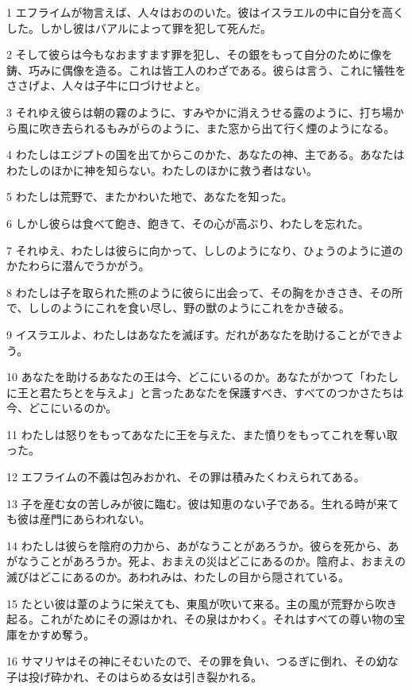 \par 1 エフライムが物言えば、人々はおののいた。彼はイスラエルの中に自分を高くした。しかし彼はバアルによって罪を犯して死んだ。
\par 2 そして彼らは今もなおますます罪を犯し、その銀をもって自分のために像を鋳、巧みに偶像を造る。これは皆工人のわざである。彼らは言う、これに犠牲をささげよ、人々は子牛に口づけせよと。
\par 3 それゆえ彼らは朝の霧のように、すみやかに消えうせる露のように、打ち場から風に吹き去られるもみがらのように、また窓から出て行く煙のようになる。
\par 4 わたしはエジプトの国を出てからこのかた、あなたの神、主である。あなたはわたしのほかに神を知らない。わたしのほかに救う者はない。
\par 5 わたしは荒野で、またかわいた地で、あなたを知った。
\par 6 しかし彼らは食べて飽き、飽きて、その心が高ぶり、わたしを忘れた。
\par 7 それゆえ、わたしは彼らに向かって、ししのようになり、ひょうのように道のかたわらに潜んでうかがう。
\par 8 わたしは子を取られた熊のように彼らに出会って、その胸をかきさき、その所で、ししのようにこれを食い尽し、野の獣のようにこれをかき破る。
\par 9 イスラエルよ、わたしはあなたを滅ぼす。だれがあなたを助けることができよう。
\par 10 あなたを助けるあなたの王は今、どこにいるのか。あなたがかつて「わたしに王と君たちとを与えよ」と言ったあなたを保護すべき、すべてのつかさたちは今、どこにいるのか。
\par 11 わたしは怒りをもってあなたに王を与えた、また憤りをもってこれを奪い取った。
\par 12 エフライムの不義は包みおかれ、その罪は積みたくわえられてある。
\par 13 子を産む女の苦しみが彼に臨む。彼は知恵のない子である。生れる時が来ても彼は産門にあらわれない。
\par 14 わたしは彼らを陰府の力から、あがなうことがあろうか。彼らを死から、あがなうことがあろうか。死よ、おまえの災はどこにあるのか。陰府よ、おまえの滅びはどこにあるのか。あわれみは、わたしの目から隠されている。
\par 15 たとい彼は葦のように栄えても、東風が吹いて来る。主の風が荒野から吹き起る。これがためにその源はかれ、その泉はかわく。それはすべての尊い物の宝庫をかすめ奪う。
\par 16 サマリヤはその神にそむいたので、その罪を負い、つるぎに倒れ、その幼な子は投げ砕かれ、そのはらめる女は引き裂かれる。


